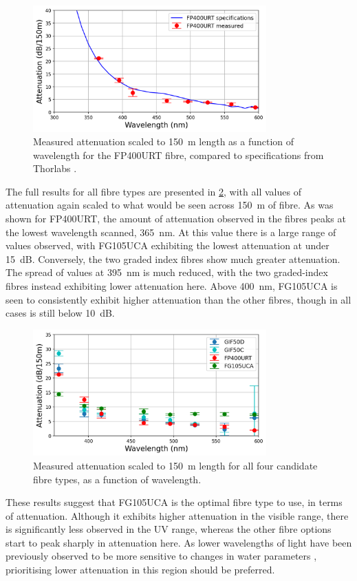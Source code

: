 \documentclass[a4paper,11pt]{article}
\begin{document}
\begin{figure}[h]
\centering
\includegraphics[width=0.8\textwidth]{FP400Compar.png}
\caption{Measured attenuation scaled to 150~m length as a function of wavelength for the FP400URT fibre, compared to specifications from Thorlabs \cite{bib:fp400urt}.}\label{fig:fp400compar}
\end{figure}

The full results for all fibre types are presented in \cref{fig:attenall}, with all values of attenuation again scaled to what would be seen across 150~m of fibre. As was shown for FP400URT, the amount of attenuation observed in the fibres peaks at the lowest wavelength scanned, 365~nm. At this value there is a large range of values observed, with FG105UCA exhibiting the lowest attenuation at under 15~dB. Conversely, the two graded index fibres show much greater attenuation. The spread of values at 395~nm is much reduced, with the two graded-index fibres instead exhibiting lower attenuation here. Above 400~nm, FG105UCA is seen to consistently exhibit higher attenuation than the other fibres, though in all cases is still below 10~dB.
\begin{figure}[h]
\centering
\includegraphics[width=0.8\textwidth]{AttenAll.png}
\caption{Measured attenuation scaled to 150~m length for all four candidate fibre types, as a function of wavelength.}\label{fig:attenall}
\end{figure}
These results suggest that FG105UCA is the optimal fibre type to use, in terms of attenuation. Although it exhibits higher attenuation in the visible range, there is significantly less observed in the UV range, whereas the other fibre options start to peak sharply in attenuation here. As lower wavelengths of light have been previously observed to be more sensitive to changes in water parameters \cite{bib:skgd2}, prioritising lower attenuation in this region should be preferred.
\end{document}
